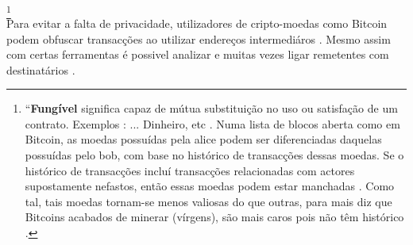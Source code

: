\\ \newline
\footnote{``\textbf{Fungível} significa capaz de mútua substituição no uso ou satisfação de um contrato. Exemplos : ... Dinheiro, etc \cite{mises-org-fungible}. Numa lista de blocos aberta como em Bitcoin, as moedas possuídas pela alice podem ser diferenciadas daquelas possuídas pelo bob, com base no histórico de transacções dessas moedas. Se o histórico de transacções incluí transacções relacionadas com actores supostamente nefastos, então essas moedas podem estar manchadas \cite{bitcoin-big-bang-taint}. Como tal, tais moedas tornam-se menos valiosas do que outras, para mais diz que Bitcoins acabados de minerar (vírgens), são mais caros pois não têm histórico \cite{new-bitcoin-premium}.}
\\ \newline
Para evitar a falta de privacidade, utilizadores de cripto-moedas como Bitcoin podem obfuscar transacções ao utilizar endereços intermediáros \cite{DBLP:journals/corr/NarayananM17}. Mesmo assim com certas ferramentas é possivel analizar e muitas vezes ligar remetentes com destinatários \cite{DBLP:journals/corr/ShenTuY15b, DK-police-tracing-btc, Andrew-Cox-Sandia, chainalysis-2020-report}.
  

